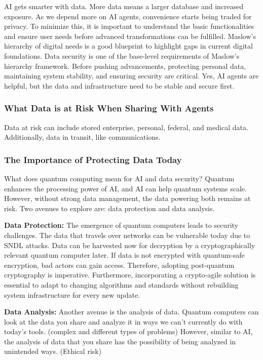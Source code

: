 \documentclass{article}
\begin{document}
AI gets smarter with data. More data means a larger database and increased exposure. As we depend more on AI agents, convenience starts being traded for privacy. To minimize this, it is important to understand the basic functionalities and ensure user needs before advanced transformations can be fulfilled. Maslow’s hierarchy of digital needs is a good blueprint to highlight gaps in current digital foundations. Data security is one of the base-level requirements of Maslow’s hierarchy framework. Before pushing advancements, protecting personal data, maintaining system stability, and ensuring security are critical. Yes, AI agents are helpful, but the data and infrastructure need to be stable and secure first. 

\subsubsection{What Data is at Risk When Sharing With Agents} 

Data at risk can include stored enterprise, personal, federal, and medical data. Additionally, data in transit, like communications.

\subsubsection{The Importance of Protecting Data Today}
What does quantum computing mean for AI and data security? Quantum enhances the processing power of AI, and AI can help quantum systems scale. However, without strong data management, the data powering both remains at risk. Two avenues to explore are: data protection and data analysis. 

\textbf{Data Protection:} The emergence of quantum computers leads to security challenges. The data that travels over networks can be vulnerable today due to SNDL attacks. Data can be harvested now for decryption by a cryptographically relevant quantum computer later. If data is not encrypted with quantum-safe encryption, bad actors can gain access. Therefore, adopting post-quantum cryptography is imperative. Furthermore, incorporating a crypto-agile solution is essential to adapt to changing algorithms and standards without rebuilding system infrastructure for every new update.   

\textbf{Data Analysis:} Another avenue is the analysis of data. Quantum computers can look at the data you share and analyze it in ways we can’t currently do with today’s tools. (complex and different types of problems) However, similar to AI, the analysis of data that you share has the possibility of being analyzed in unintended ways. (Ethical risk) 
\end{document}
